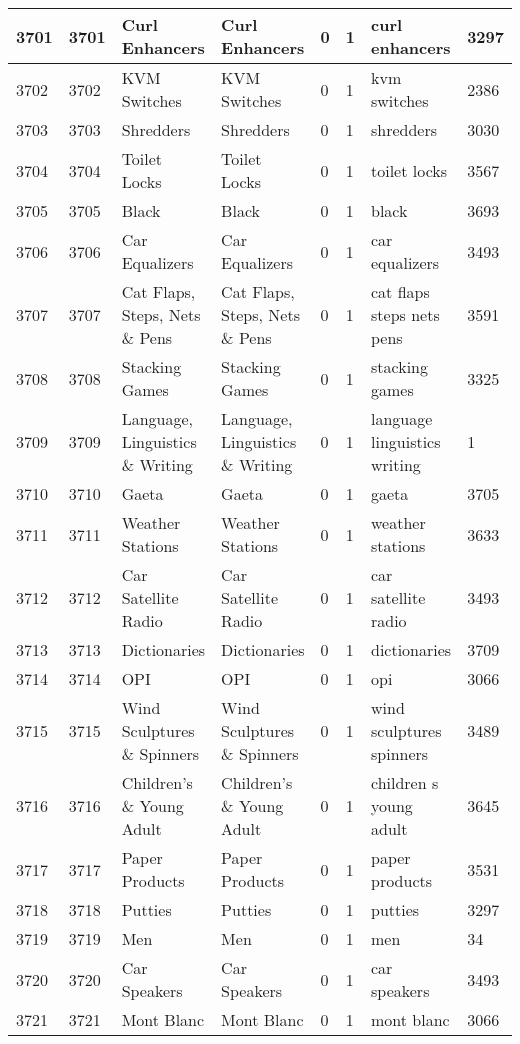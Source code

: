 \begin{longtable}{|l|l|l|l|l|l|l|l|}
3701 & 3701 & Curl Enhancers & Curl Enhancers & 0 & 1 & curl enhancers & 3297 \\ \hline 
3702 & 3702 & KVM Switches & KVM Switches & 0 & 1 & kvm switches & 2386 \\ \hline 
3703 & 3703 & Shredders & Shredders & 0 & 1 & shredders & 3030 \\ \hline 
3704 & 3704 & Toilet Locks & Toilet Locks & 0 & 1 & toilet locks & 3567 \\ \hline 
3705 & 3705 & Black & Black & 0 & 1 & black & 3693 \\ \hline 
3706 & 3706 & Car Equalizers & Car Equalizers & 0 & 1 & car equalizers & 3493 \\ \hline 
3707 & 3707 & Cat Flaps, Steps, Nets \& Pens & Cat Flaps, Steps, Nets \& Pens & 0 & 1 & cat flaps steps nets pens & 3591 \\ \hline 
3708 & 3708 & Stacking Games & Stacking Games & 0 & 1 & stacking games & 3325 \\ \hline 
3709 & 3709 & Language, Linguistics \& Writing & Language, Linguistics \& Writing & 0 & 1 & language linguistics writing & 1 \\ \hline 
3710 & 3710 & Gaeta & Gaeta & 0 & 1 & gaeta & 3705 \\ \hline 
3711 & 3711 & Weather Stations & Weather Stations & 0 & 1 & weather stations & 3633 \\ \hline 
3712 & 3712 & Car Satellite Radio & Car Satellite Radio & 0 & 1 & car satellite radio & 3493 \\ \hline 
3713 & 3713 & Dictionaries & Dictionaries & 0 & 1 & dictionaries & 3709 \\ \hline 
3714 & 3714 & OPI & OPI & 0 & 1 & opi & 3066 \\ \hline 
3715 & 3715 & Wind Sculptures \& Spinners & Wind Sculptures \& Spinners & 0 & 1 & wind sculptures spinners & 3489 \\ \hline 
3716 & 3716 & Children's \& Young Adult & Children's \& Young Adult & 0 & 1 & children s young adult & 3645 \\ \hline 
3717 & 3717 & Paper Products & Paper Products & 0 & 1 & paper products & 3531 \\ \hline 
3718 & 3718 & Putties & Putties & 0 & 1 & putties & 3297 \\ \hline 
3719 & 3719 & Men & Men & 0 & 1 & men & 34 \\ \hline 
3720 & 3720 & Car Speakers & Car Speakers & 0 & 1 & car speakers & 3493 \\ \hline 
3721 & 3721 & Mont Blanc & Mont Blanc & 0 & 1 & mont blanc & 3066 \\ \hline 

\end{longtable}
